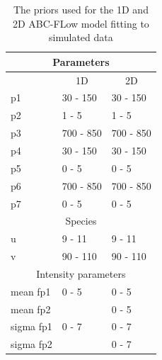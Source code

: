 


\begin{table}[tb]
\centering
\caption{The priors used for the 1D and 2D ABC-FLow model fitting to simulated data}
\label{tab:priors_model}

\begin{tabular}{@{}lll@{}}
\toprule
\multicolumn{3}{c}{Parameters}                                         \\ \midrule
\multicolumn{1}{c}{} & \multicolumn{1}{c}{1D} & \multicolumn{1}{c}{2D} \\ \midrule
p1                   & 30 - 150               & 30 - 150               \\
p2                   & 1 - 5                  & 1 - 5                  \\
p3                   & 700 - 850              & 700 - 850              \\
p4                   & 30 - 150               & 30 - 150               \\
p5                   & 0 - 5                  & 0 - 5                  \\
p6                   & 700 - 850              & 700 - 850              \\
p7                   & 0 - 5                  & 0 - 5                  \\ \midrule
\multicolumn{3}{c}{Species}                                            \\ \midrule
u                    & 9 - 11                 & 9 - 11                 \\
v                    & 90 - 110               & 90 - 110               \\ \midrule
\multicolumn{3}{c}{Intensity parameters}                               \\ \midrule
mean fp1             & 0 - 5                  & 0 - 5                  \\
mean fp2             &                   & 0 - 5                  \\
sigma fp1            & 0 - 7                  & 0 - 7                  \\
sigma fp2            &                   & 0 - 7                  \\ \bottomrule
\end{tabular}

\end{table}

